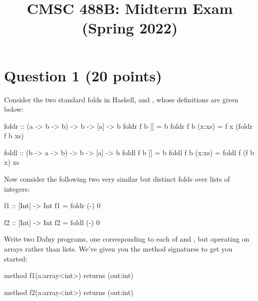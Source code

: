 \documentclass{article}
\title{CMSC 488B: Midterm Exam (Spring 2022)}
\author{}
\date{}
\begin{document}
\maketitle

\section*{Question 1 (20 points)}

Consider the two standard folds in Haskell,  and ,
whose definitions are given below:
\begin{hask}
  foldr :: (a -> b -> b) -> b -> [a] -> b
  foldr f b [] = b
  foldr f b (x:xs) = f x (foldr f b xs)
   
  foldl :: (b -> a -> b) -> b -> [a] -> b
  foldl f b [] = b
  foldl f b (x:xs) = foldl f (f b x) xs
\end{hask}

Now consider the following two very similar but distinct folds over
lists of integers:

\begin{hask}
  f1 :: [Int] -> Int
  f1 = foldr (-) 0

  f2 :: [Int] -> Int
  f2 = foldl (-) 0
\end{hask}

Write two Dafny programs, one corresponding to each of  and
, but operating on arrays rather than lists. We've given you
the method signatures to get you started:


\begin{minipage}{0.45\textwidth}
\begin{hask}
method f1(a:array<int>) returns (out:int) {                   


  



















}                                                             
\end{hask}
\end{minipage}
\hfill \vline \hfill
\begin{minipage}{0.45\textwidth}
\begin{hask}
method f2(a:array<int>) returns (out:int) {





















  
}                                                             
\end{hask}
\end{minipage}
\end{document}
